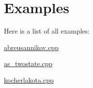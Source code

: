 \section{Examples}
Here is a list of all examples\-:\begin{DoxyCompactItemize}
\item 
\hyperlink{abreusannikov_8cpp-example}{abreusannikov.\-cpp}
\item 
\hyperlink{as_twostate_8cpp-example}{as\-\_\-twostate.\-cpp}
\item 
\hyperlink{kocherlakota_8cpp-example}{kocherlakota.\-cpp}
\end{DoxyCompactItemize}
